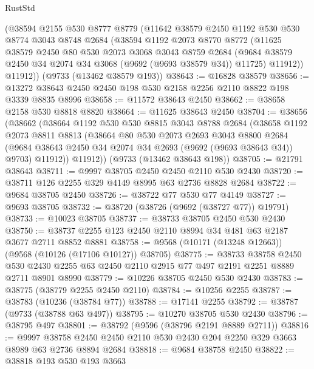 \begin{lexlean}{RustStd}
\begin{coremodule}
    (@38594
      @2155
      @530
      @8777
      @8779
      (@11642
        @38579
        @2450
        @1192
        @530
        @530
        @8774
        @3043
        @8748
        @2684
        (@38594
          @1192
          @2073
          @8770
          @8772
          (@11625
            @38579
            @2450
            @80
            @530
            @2073
            @3068
            @3043
            @8759
            @2684
            (@9684 @38579 @2450 @34 @2074 @34 @3068 (@9692 (@9693 @38579 @34)) @11725)
            @11912))
        @11912))
    (@9733 (@13462 @38579 @193))
@38643 := @16828 @38579
@38656 := @13272 @38643 @2450 @2450 @198 @530 @2158 @2256 @2110 @8822 @198 @3339 @8835 @8996
@38658 := @11572 @38643 @2450
@38662 := @38658 @2158 @530 @8818 @8820
@38664 := @11625 @38643 @2450
@38704 := @38656
    (@38662
      (@38664
        @1192
        @530
        @530
        @8815
        @3043
        @8788
        @2684
        (@38658
          @1192
          @2073
          @8811
          @8813
          (@38664
            @80
            @530
            @2073
            @2693
            @3043
            @8800
            @2684
            (@9684 @38643 @2450 @34 @2074 @34 @2693 (@9692 (@9693 @38643 @34)) @9703)
            @11912))
        @11912))
    (@9733 (@13462 @38643 @198))
@38705 := @21791 @38643
@38711 := @9997 @38705 @2450 @2450 @2110 @530 @2430
@38720 := @38711 @126 @2255 @329 @4149 @8995 @63 @2736 @8828 @2684
@38722 := @9684 @38705 @2450
@38726 := @38722 @77 @530 @77 @4149
@38727 := @9693 @38705
@38732 := @38720 (@38726 (@9692 (@38727 @77)) @19791)
@38733 := @10023 @38705
@38737 := @38733 @38705 @2450 @530 @2430
@38750 := @38737 @2255 @123 @2450 @2110 @8994 @34 @481 @63 @2187 @3677 @2711 @8852 @8881
@38758 := @9568 (@10171 (@13248 @12663)) (@9568 (@10126 (@17106 @10127)) @38705)
@38775 := @38733
    @38758
    @2450
    @530
    @2430
    @2255
    @63
    @2450
    @2110
    @2915
    @77
    @497
    @2191
    @2251
    @8889
    @2711
    @8901
    @8990
@38779 := @10226 @38705 @2450 @530 @2430
@38783 := @38775 (@38779 @2255 @2450 @2110)
@38784 := @10256 @2255
@38787 := @38783 (@10236 (@38784 @77))
@38788 := @17141 @2255
@38792 := @38787 (@9733 (@38788 @63 @497))
@38795 := @10270 @38705 @530 @2430
@38796 := @38795 @497
@38801 := @38792 (@9596 (@38796 @2191 @8889 @2711))
@38816 := @9997
    @38758
    @2450
    @2450
    @2110
    @530
    @2430
    @204
    @2250
    @329
    @3663
    @8989
    @63
    @2736
    @8894
    @2684
@38818 := @9684 @38758 @2450
@38822 := @38818 @193 @530 @193 @3663

\end{coremodule}
\end{lexlean}
